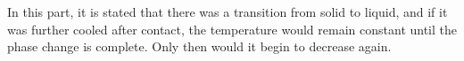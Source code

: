 In this part, it is stated that there was a transition from solid to liquid, and if it was further cooled after contact, the temperature would remain constant until the phase change is complete. Only then would it begin to decrease again.